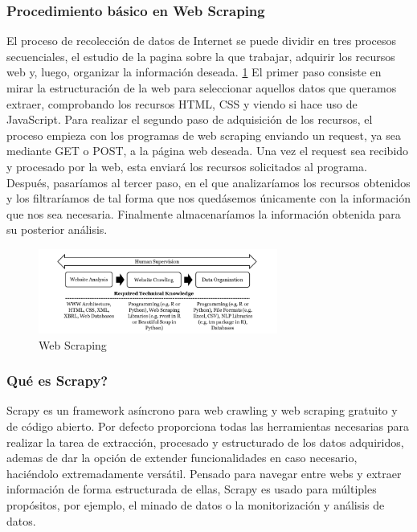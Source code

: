 \subsubsection{Procedimiento básico en Web Scraping}
El proceso de recolección de datos de Internet se puede dividir en tres procesos secuenciales, el estudio de la pagina sobre la que trabajar, adquirir los recursos web y, luego, organizar la información deseada. \ref{fig:ej2}
\newline
\newline
El primer paso consiste en mirar la estructuración de la web para seleccionar aquellos datos que queramos extraer, comprobando los recursos HTML, CSS y viendo si hace uso de JavaScript. Para realizar el segundo paso de adquisición de los recursos, el proceso empieza con los programas de web scraping enviando un request, ya sea mediante GET o POST, a la página web deseada. Una vez el request sea recibido y procesado por la web, esta enviará los recursos solicitados al programa. Después, pasaríamos al tercer paso, en el que analizaríamos los recursos obtenidos y los filtraríamos de tal forma que nos quedásemos únicamente con la información que nos sea necesaria. Finalmente almacenaríamos la información obtenida para su posterior análisis.
\newline
\begin{figure} [h!]
	\centering
	\includegraphics[width=0.7\textwidth]{fig/Web-Scraping-Adapted-from-Krotov-and-Tennyson-2018.png}
	\caption[Web Scraping (Krotov y Tennyson 2018)]{Web Scraping \footnotemark}
	\label{fig:ej2}
\end{figure}

\subsubsection{Qué es Scrapy?}
Scrapy es un framework asíncrono para web crawling y web scraping gratuito y de código abierto. Por defecto proporciona todas las herramientas necesarias para realizar la tarea de extracción, procesado y estructurado de los datos adquiridos, ademas de dar la opción de extender funcionalidades en caso necesario, haciéndolo extremadamente versátil. \cite{yang2019design}
\newline
\newline
Pensado para navegar entre webs y extraer información de forma estructurada de ellas, Scrapy es usado para múltiples propósitos, por ejemplo, el minado de datos o la monitorización y análisis de datos.

